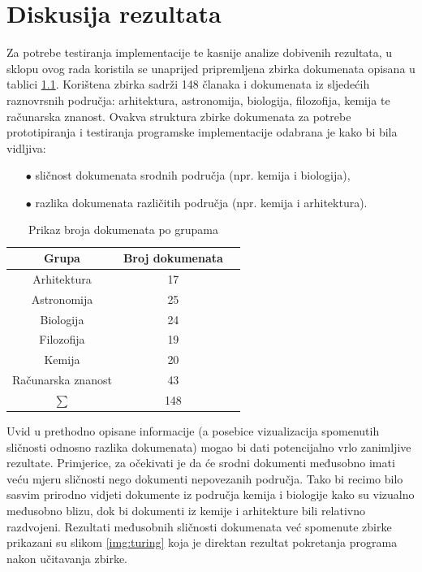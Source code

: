 \documentclass[times, utf8, zavrsni, numeric]{fer}
\begin{document}
\chapter{Diskusija rezultata}
\label{chap:results}
Za potrebe testiranja implementacije te kasnije analize dobivenih rezultata, u sklopu ovog rada koristila se unaprijed pripremljena zbirka dokumenata opisana u tablici \ref{table:datasetinfo}. Korištena zbirka sadrži 148 članaka i dokumenata iz sljedećih raznovrsnih područja: arhitektura, astronomija, biologija, filozofija, kemija te računarska znanost. Ovakva struktura zbirke dokumenata za potrebe prototipiranja i testiranja programske implementacije odabrana je kako bi bila vidljiva:
\begin{itemize}
\item[$\bullet$] sličnost dokumenata srodnih područja (npr. kemija i biologija),
\item[$\bullet$] razlika dokumenata različitih područja (npr. kemija i arhitektura).
\end{itemize}

\begin{table}
\begin{center}
\begin{tabular}{|c|c|c|}
\hline
Grupa & Broj dokumenata \\
\hline
Arhitektura & 17 \\
Astronomija & 25 \\
Biologija & 24 \\
Filozofija & 19 \\
Kemija & 20 \\
Računarska znanost & 43 \\
\hline
$\sum$ & 148 \\
\hline
\end{tabular}
\end{center}
\caption{Prikaz broja dokumenata po grupama}
\label{table:datasetinfo}
\end{table}

Uvid u prethodno opisane informacije (a posebice vizualizacija spomenutih sličnosti odnosno razlika dokumenata) mogao bi dati potencijalno vrlo zanimljive rezultate. Primjerice, za očekivati je da će srodni dokumenti međusobno imati veću mjeru sličnosti nego dokumenti nepovezanih područja. Tako bi recimo bilo sasvim prirodno vidjeti dokumente iz područja kemija i biologije kako su vizualno međusobno blizu, dok bi dokumenti iz kemije i arhitekture bili relativno razdvojeni. Rezultati međusobnih sličnosti dokumenata već spomenute zbirke prikazani su slikom \ref{img:turing} koja je direktan rezultat pokretanja programa nakon učitavanja zbirke.
\end{document}
